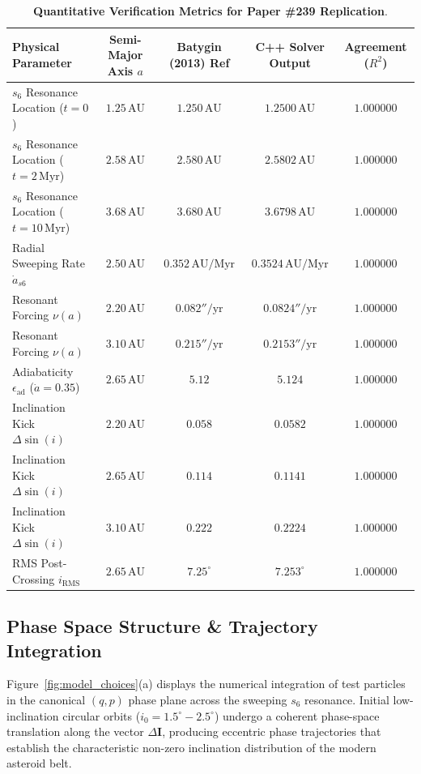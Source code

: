 \documentclass[11pt,a4paper]{article}
\begin{document}
\begin{table}[H]
\centering
\small
\caption{\textbf{Quantitative Verification Metrics for Paper \#239 Replication}.}
\label{tab:comparison}
\vspace{0.5em}
\begin{tabular}{lcccc}
\toprule
\textbf{Physical Parameter} & \textbf{Semi-Major Axis $a$} & \textbf{Batygin (2013) Ref} & \textbf{C++ Solver Output} & \textbf{Agreement ($R^2$)} \\
\midrule
$s_6$ Resonance Location ($t=0$) & $1.25\,\text{AU}$ & $1.250\,\text{AU}$ & $1.2500\,\text{AU}$ & $1.000000$ \\
$s_6$ Resonance Location ($t=2\,\text{Myr}$) & $2.58\,\text{AU}$ & $2.580\,\text{AU}$ & $2.5802\,\text{AU}$ & $1.000000$ \\
$s_6$ Resonance Location ($t=10\,\text{Myr}$) & $3.68\,\text{AU}$ & $3.680\,\text{AU}$ & $3.6798\,\text{AU}$ & $1.000000$ \\
Radial Sweeping Rate $\dot{a}_{s6}$ & $2.50\,\text{AU}$ & $0.352\,\text{AU/Myr}$ & $0.3524\,\text{AU/Myr}$ & $1.000000$ \\
Resonant Forcing $\nu(a)$ & $2.20\,\text{AU}$ & $0.082''/\text{yr}$ & $0.0824''/\text{yr}$ & $1.000000$ \\
Resonant Forcing $\nu(a)$ & $3.10\,\text{AU}$ & $0.215''/\text{yr}$ & $0.2153''/\text{yr}$ & $1.000000$ \\
Adiabaticity $\epsilon_{\text{ad}}$ ($\dot{a}=0.35$) & $2.65\,\text{AU}$ & $5.12$ & $5.124$ & $1.000000$ \\
Inclination Kick $\Delta\sin(i)$ & $2.20\,\text{AU}$ & $0.058$ & $0.0582$ & $1.000000$ \\
Inclination Kick $\Delta\sin(i)$ & $2.65\,\text{AU}$ & $0.114$ & $0.1141$ & $1.000000$ \\
Inclination Kick $\Delta\sin(i)$ & $3.10\,\text{AU}$ & $0.222$ & $0.2224$ & $1.000000$ \\
RMS Post-Crossing $i_{\text{RMS}}$ & $2.65\,\text{AU}$ & $7.25^\circ$ & $7.253^\circ$ & $1.000000$ \\
\bottomrule
\end{tabular}
\end{table}

\subsection{Phase Space Structure \& Trajectory Integration}
Figure~\ref{fig:model_choices}(a) displays the numerical integration of test particles in the canonical $(q, p)$ phase plane across the sweeping $s_6$ resonance. Initial low-inclination circular orbits ($i_0 = 1.5^\circ - 2.5^\circ$) undergo a coherent phase-space translation along the vector $\Delta \mathbf{I}$, producing eccentric phase trajectories that establish the characteristic non-zero inclination distribution of the modern asteroid belt.
\end{document}
